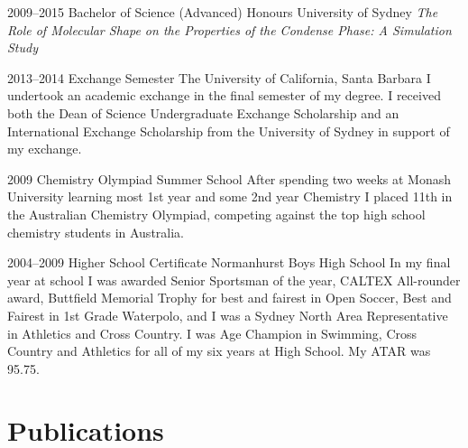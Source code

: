 \documentclass[]{friggeri-cv} %
\begin{document}
\begin{entrylist}


\entry
{2009--2015}
{Bachelor of Science (Advanced) Honours}
{University of Sydney}
{\emph{The Role of Molecular Shape on the Properties of the Condense Phase: A Simulation Study}
}


\entry
{2013--2014}
{Exchange Semester}
{The University of California, Santa Barbara}
{I undertook an academic exchange in the final semester of my degree. I received both the Dean of Science Undergraduate Exchange Scholarship and an International Exchange Scholarship from the University of Sydney in support of my exchange.}


\entry
{2009}
{Chemistry Olympiad Summer School}
{}
{After spending two weeks at Monash University learning most 1st year and some 2nd year Chemistry I placed 11th in the Australian Chemistry Olympiad, competing against the top high school chemistry students in Australia.}

\entry
{2004--2009}
{Higher School Certificate}
{Normanhurst Boys High School}
{In my final year at school I was awarded Senior Sportsman of the year, CALTEX All-rounder award, Buttfield Memorial Trophy for best and fairest in Open Soccer, Best and Fairest in 1st Grade Waterpolo, and I was a Sydney North Area Representative in Athletics and Cross Country. I was Age Champion in Swimming, Cross Country and Athletics for all of my six years at High School. My ATAR was 95.75.
}


\end{entrylist}



\section{Publications}


\end{document}
